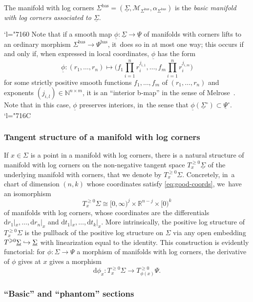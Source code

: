 \documentclass[JEP,XML,SOM,Unicode,NoFloatCountersInSection,published]{cedram}
\newcommand{\Changel}{\mathcode`l="7160}
\newcommand{\Changelback}{\mathcode`l="716C}
\newcommand\hto{\mathrel{\lhook\joinrel\to}}
\newcommand{\rbbrac}[1]{\biggl(#1\biggr)}
\theoremstyle{definition}
\theoremstyle{remark}
\let\defn\emph
\newcommand{\RR}{\mathbb{R}}
\newcommand{\NN}{\mathbb{N}}
\renewcommand{\ge}{\geqslant}
\newcommand{\cM}{\mathscr{M}}
\newcommand{\dd}{\mathrm{d}}
\newcommand{\Sig}{\Sigma}
\newcommand{\uSig}{\underline{\Sigma}}
\newcommand{\uphi}{\underline{\phi}}
\newcommand{\uPsi}{\underline{\Psi}}
\newcommand{\bas}[1]{{#1}^{\mathrm{bas}}}
\newcommand{\Sigbas}{\bas{\Sig}}
\newcommand{\Psibas}{\bas{\Psi}}
\newcommand{\tbge}[2][]{T^{\ge0}_{#1}#2}
\begin{document}
\begin{definition}\label{def:Sigbas}
The manifold with log corners $\Sigbas = (\uSig,\cM_{\Sigbas},\alpha_{\Sigbas})$ is the \defn{basic
manifold with log corners associated to $\uSig$}.
\end{definition}

\Changel
Note that if a smooth map $\uphi:\uSig \to \uPsi$ of manifolds with corners lifts to an ordinary morphism $\Sigbas \to \Psibas$, it~does so in at most one way; this occurs if and only if, when expressed in local coordinates, $\uphi$ has the form
\[
\uphi \colon (r_1,\ldots,r_n) \longmapsto \rbbrac{f_1 \prod_{i=1}^n r_i^{j_{i,1}},\ldots, f_{m} \prod_{i=1}^n r_i^{j_{i,m}}}
\]
for some strictly positive smooth functions $f_1,\ldots,f_{m}$ of $(r_1,\ldots,r_n)$ and exponents $(j_{i,l}) \in \NN^{n\times m}$, \ie it is an ``interior b-map'' in the sense of Melrose~\cite{Melrose1992}. Note that in this case, $\uphi$ preserves interiors, in~the sense that $\uphi(\uSig^\circ) \subset \uPsi^\circ$.
\Changelback

\subsubsection{Tangent structure of a manifold with log corners}\label{sec:tangent-log-corners}
If $x\in \Sig$ is a point in a manifold with log corners, there is a natural structure of manifold with log corners on the non-negative tangent space $\tbge[x]{\uSig}$ of the underlying manifold with corners, that we denote by $\tbge[x]{\Sig}$. Concretely, in~a chart of dimension $(n,k)$ whose coordinates satisfy \eqref{eq:good-coords}, we~have an isomorphism
\[
\tbge[x]{\Sig} \cong [0,\infty)^j\times \RR^{n-j}\times [0)^k
\]
of manifolds with log corners, whose coordinates are the differentials $\dd r_1|_x,\ldots,\dd r_n|_x$ and $\dd t_1|_x,\ldots,\dd t_k|_x$. More intrinsically, the positive log structure of $\tbge[x]{\Sig}$ is the pullback of the positive log structure on $\Sig$ via any open embedding $\tbge{\uSig} \hto \uSig$ with linearization equal to the identity. This construction is evidently functorial: for $\phi\colon \Sig\to \Psi$ a morphism of manifolds with log corners, the derivative of $\phi$ gives at $x$ gives a morphism
\[
\dd \phi_x\colon T_x^{\ge 0}\Sig \to T_{\phi(x)}^{\ge 0}\Psi.
\]


\subsubsection{``Basic'' and ``phantom'' sections}
\end{document}
